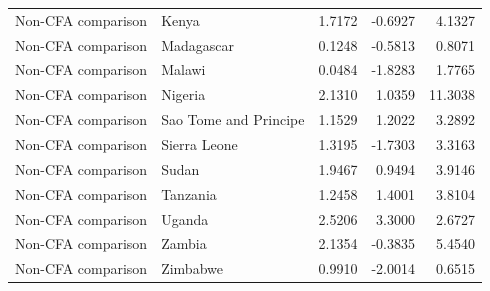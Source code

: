 \begin{table}
\begin{tabular}[t]{llrrr}
Non-CFA comparison & Kenya & 1.7172 & -0.6927 & 4.1327\\
\addlinespace
Non-CFA comparison & Madagascar & 0.1248 & -0.5813 & 0.8071\\
Non-CFA comparison & Malawi & 0.0484 & -1.8283 & 1.7765\\
Non-CFA comparison & Nigeria & 2.1310 & 1.0359 & 11.3038\\
Non-CFA comparison & Sao Tome and Principe & 1.1529 & 1.2022 & 3.2892\\
Non-CFA comparison & Sierra Leone & 1.3195 & -1.7303 & 3.3163\\
\addlinespace
Non-CFA comparison & Sudan & 1.9467 & 0.9494 & 3.9146\\
Non-CFA comparison & Tanzania & 1.2458 & 1.4001 & 3.8104\\
Non-CFA comparison & Uganda & 2.5206 & 3.3000 & 2.6727\\
Non-CFA comparison & Zambia & 2.1354 & -0.3835 & 5.4540\\
Non-CFA comparison & Zimbabwe & 0.9910 & -2.0014 & 0.6515\\
\bottomrule
\end{tabular}
\end{table}